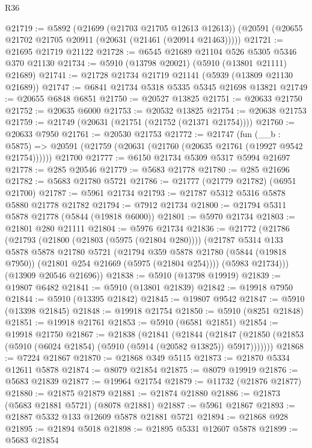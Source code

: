 \begin{lexlean}{R36}
\begin{coremodule}
@21719 := @5892
    (@21699 (@21703 @21705 @12613 @12613))
    (@20591 (@20655 @21702 @21705 @20911 (@20631 (@21461 (@20914 @21463)))))
@21721 := @21695 @21719 @21122
@21728 := @6545 @21689 @21104 @526 @5305 @5346 @370 @21130
@21734 := @5910 (@13798 @20021) (@5910 (@13801 @21111) @21689)
@21741 := @21728 @21734 @21719 @21141 (@5939 (@13809 @21130 @21689))
@21747 := @6841 @21734 @5318 @5335 @5345 @21698 @13821
@21749 := @20655 @6848 @6851
@21750 := @20527 @13825
@21751 := @20633 @21750
@21752 := @20635 @6000
@21753 := @20532 @13825
@21754 := @20638 @21753
@21759 := @21749 (@20631 (@21751 (@21752 (@21371 @21754))))
@21760 := @20633 @7950
@21761 := @20530 @21753
@21772 := @21747
    (fun (__b : @5875) => @20591 (@21759 (@20631 (@21760 (@20635 @21761 (@19927 @9542 @21754))))))
    @21700
@21777 := @6150 @21734 @5309 @5317 @5994 @21697
@21778 := @285 @20546
@21779 := @5683 @21778
@21780 := @285 @21696
@21782 := @5683 @21780 @5721
@21786 := @21777 (@21779 @21782) (@6951 @21700)
@21787 := @5961 @21734
@21793 := @21787 @5312 @5316 @5878 @5880 @21778 @21782
@21794 := @7912 @21734
@21800 := @21794 @5311 @5878 @21778 (@5844 (@19818 @6000))
@21801 := @5970 @21734
@21803 := @21801 @280 @21111
@21804 := @5976 @21734
@21836 := @21772
    (@21786
      (@21793
        (@21800 (@21803 (@5975 (@21804 @280))))
        (@21787
          @5314
          @133
          @5878
          @5878
          @21780
          @5721
          (@21794
            @359
            @5878
            @21780
            (@5844 (@19818 @7950))
            (@21801 @254 @21669 (@5975 (@21804 @254))))
          (@5983 @21734)))
      (@13909 @20546 @21696))
@21838 := @5910 (@13798 @19919)
@21839 := @19807 @6482
@21841 := @5910 (@13801 @21839)
@21842 := @19918 @7950
@21844 := @5910 (@13395 @21842)
@21845 := @19807 @9542
@21847 := @5910 (@13398 @21845)
@21848 := @19918 @21754
@21850 := @5910 (@8251 @21848)
@21851 := @19918 @21761
@21853 := @5910 (@6581 @21851)
@21854 := @19918 @21750
@21867 := @21838
    (@21841
      (@21844
        (@21847 (@21850 (@21853 (@5910 (@6024 @21854) (@5910 (@5914 (@20582 @13825)) @5917)))))))
@21868 := @7224 @21867
@21870 := @21868 @349 @5115
@21873 := @21870 @5334 @12611 @5878
@21874 := @8079 @21854
@21875 := @8079 @19919
@21876 := @5683 @21839
@21877 := @19964 @21754
@21879 := @11732 (@21876 @21877)
@21880 := @21875 @21879
@21881 := @21874 @21880
@21886 := @21873 (@5683 @21881 @5721) (@8078 @21881)
@21887 := @5961 @21867
@21893 := @21887 @5332 @133 @12609 @5878 @21881 @5721
@21894 := @21868 @928
@21895 := @21894 @5018
@21898 := @21895 @5331 @12607 @5878
@21899 := @5683 @21854

\end{coremodule}
\end{lexlean}
